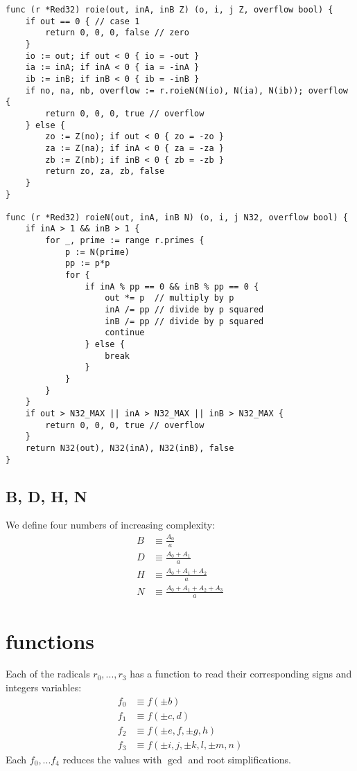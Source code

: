 \documentclass{article}
\begin{document}
\begin{lstlisting}
func (r *Red32) roie(out, inA, inB Z) (o, i, j Z, overflow bool) {
	if out == 0 { // case 1
		return 0, 0, 0, false // zero
	}
	io := out; if out < 0 { io = -out }
	ia := inA; if inA < 0 { ia = -inA }
	ib := inB; if inB < 0 { ib = -inB }
	if no, na, nb, overflow := r.roieN(N(io), N(ia), N(ib)); overflow {
		return 0, 0, 0, true // overflow
	} else {
		zo := Z(no); if out < 0 { zo = -zo }
		za := Z(na); if inA < 0 { za = -za }
		zb := Z(nb); if inB < 0 { zb = -zb }
		return zo, za, zb, false
	}
}

func (r *Red32) roieN(out, inA, inB N) (o, i, j N32, overflow bool) {
	if inA > 1 && inB > 1 {
		for _, prime := range r.primes {
			p := N(prime)
			pp := p*p
			for {
				if inA % pp == 0 && inB % pp == 0 {
					out *= p  // multiply by p
					inA /= pp // divide by p squared
					inB /= pp // divide by p squared
					continue
				} else {
					break
				}
			}
		}
	}
	if out > N32_MAX || inA > N32_MAX || inB > N32_MAX {
		return 0, 0, 0, true // overflow
	}
	return N32(out), N32(inA), N32(inB), false 
}
\end{lstlisting}

\subsection{B, D, H, N}

We define four numbers of increasing complexity:
\begin{align}
B &\equiv \frac{A_0}{a}\\
D &\equiv \frac{A_0 + A_1}{a}\\
H &\equiv \frac{A_0 + A_1 + A_2}{a}\\
N &\equiv \frac{A_0 + A_1 + A_2 + A_3}{a}
\end{align}


\section{functions}
Each of the radicals $r_0,...,r_3$ has a function to read their corresponding signs and integers variables:
\begin{align}
f_0 &\equiv f(\pm b)\\
f_1 &\equiv f(\pm c, d)\\
f_2 &\equiv f(\pm e, f, \pm g, h)\\
f_3 &\equiv f(\pm i, j, \pm k, l, \pm m, n)
\end{align}
Each $f_0,...f_4$ reduces the values with $\gcd$ and root simplifications.
\end{document}
